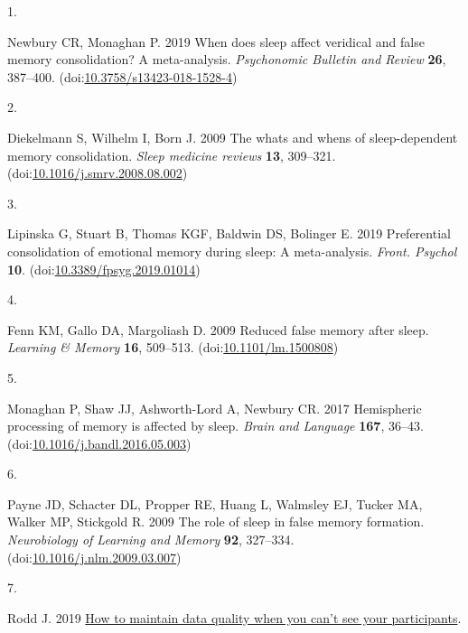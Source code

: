 \documentclass[
]{article}
\newlength{\cslhangindent}
\newlength{\csllabelwidth}
\newlength{\cslentryspacingunit} %
\newenvironment{CSLReferences}[2] %
 {%
  \setlength{\parindent}{0pt}
  \ifodd #1
  \let\oldpar\par
  \def\par{\hangindent=\cslhangindent\oldpar}
  \fi
  \setlength{\parskip}{#2\cslentryspacingunit}
 }%
 {}
\newcommand{\CSLLeftMargin}[1]{\parbox[t]{\csllabelwidth}{#1}}
\newcommand{\CSLRightInline}[1]{\parbox[t]{\linewidth - \csllabelwidth}{#1}\break}
\begin{document}
\hypertarget{refs}{}
\begin{CSLReferences}{0}{0}
\leavevmode{}%
\CSLLeftMargin{1. }%
\CSLRightInline{Newbury CR, Monaghan P. 2019 When does sleep affect veridical and false memory consolidation? A meta-analysis. \emph{Psychonomic Bulletin and Review} \textbf{26}, 387--400. (doi:\href{https://doi.org/10.3758/s13423-018-1528-4}{10.3758/s13423-018-1528-4})}

\leavevmode{}%
\CSLLeftMargin{2. }%
\CSLRightInline{Diekelmann S, Wilhelm I, Born J. 2009 The whats and whens of sleep-dependent memory consolidation. \emph{Sleep medicine reviews} \textbf{13}, 309--321. (doi:\href{https://doi.org/10.1016/j.smrv.2008.08.002}{10.1016/j.smrv.2008.08.002})}

\leavevmode{}%
\CSLLeftMargin{3. }%
\CSLRightInline{Lipinska G, Stuart B, Thomas KGF, Baldwin DS, Bolinger E. 2019 Preferential consolidation of emotional memory during sleep: A meta-analysis. \emph{Front. Psychol} \textbf{10}. (doi:\href{https://doi.org/10.3389/fpsyg.2019.01014}{10.3389/fpsyg.2019.01014})}

\leavevmode{}%
\CSLLeftMargin{4. }%
\CSLRightInline{Fenn KM, Gallo DA, Margoliash D. 2009 Reduced false memory after sleep. \emph{Learning \& Memory} \textbf{16}, 509--513. (doi:\href{https://doi.org/10.1101/lm.1500808}{10.1101/lm.1500808})}

\leavevmode{}%
\CSLLeftMargin{5. }%
\CSLRightInline{Monaghan P, Shaw JJ, Ashworth-Lord A, Newbury CR. 2017 Hemispheric processing of memory is affected by sleep. \emph{Brain and Language} \textbf{167}, 36--43. (doi:\href{https://doi.org/10.1016/j.bandl.2016.05.003}{10.1016/j.bandl.2016.05.003})}

\leavevmode{}%
\CSLLeftMargin{6. }%
\CSLRightInline{Payne JD, Schacter DL, Propper RE, Huang L, Walmsley EJ, Tucker MA, Walker MP, Stickgold R. 2009 The role of sleep in false memory formation. \emph{Neurobiology of Learning and Memory} \textbf{92}, 327--334. (doi:\href{https://doi.org/10.1016/j.nlm.2009.03.007}{10.1016/j.nlm.2009.03.007})}

\leavevmode{}%
\CSLLeftMargin{7. }%
\CSLRightInline{Rodd J. 2019 \href{https://www.psychologicalscience.org/observer/how-to-maintain-data-quality-when-you-cant-see-your-participants}{How to maintain data quality when you can't see your participants}. }


\end{CSLReferences}
\end{document}
